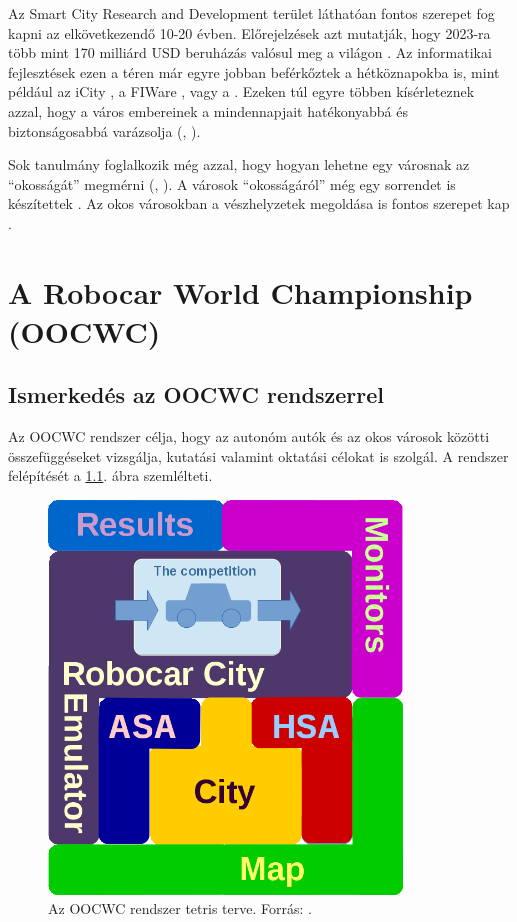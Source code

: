 \documentclass[a4paper,12pt]{report}
\begin{document}
\vspace{2mm}
Az Smart City Research and Development terület láthatóan fontos szerepet fog kapni az elkövetkezendő 10-20 évben. Előrejelzések azt mutatják, hogy 2023-ra több mint 170 milliárd USD beruházás valósul meg a világon \cite{navigant}. Az informatikai fejlesztések ezen a téren már egyre jobban beférkőztek a hétköznapokba is, mint például az iCity \cite{icity}, a FI\-Ware \cite{fiware}, vagy a \cite{vital}. Ezeken túl egyre többen kísérleteznek azzal, hogy a város embereinek a mindennapjait hatékonyabbá és biztonságosabbá varázsolja (\cite{myneighbourhood}, \cite{smartsantander}).

\vspace{2mm}
Sok tanulmány foglalkozik még azzal, hogy hogyan lehetne egy városnak az ``okosságát'' megmérni (\cite{de2014smart}, \cite{carli2013measuring}). A városok ``okosságáról'' még egy sorrendet is készítettek \cite{giffinger2007smart}. Az okos városokban a vészhelyzetek megoldása is fontos szerepet kap \cite{du2012research}.

\chapter{A Robocar World Championship (OOCWC)}
\label{oocwc}

\section{Ismerkedés az OOCWC rendszerrel}

Az OOCWC rendszer célja, hogy az autonóm autók és az okos városok közötti összefüggéseket vizsgálja, kutatási valamint oktatási célokat is szolgál. A rendszer felépítését a \ref{basedesign}. ábra szemlélteti.

\begin{figure}[ht]
\centerline{
\includegraphics[width=3.7in]{img/tetris_plan}}
\caption{Az OOCWC rendszer tetris terve. Forrás: \cite{oocwcrepo}.}
\label{basedesign}
\end{figure}
\end{document}
